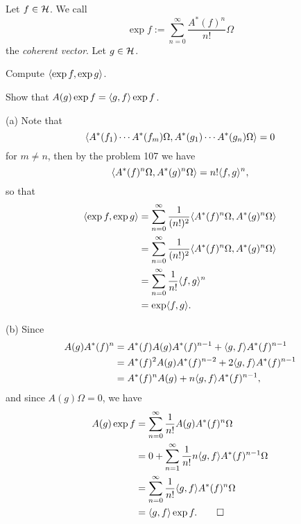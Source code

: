 \documentclass{../../../small}
\begin{document}
\begin{prb}
Let $f\in\mathcal{H}$.
We call
\[\exp f:=\sum_{n=0}^\infty\frac{A^*(f)^n}{n!}\Omega\]
the \emph{coherent vector}.
Let $g\in\mathcal{H}$.
\begin{parts}
\item Compute $\langle\exp f,\exp g\rangle$.
\item Show that $A(g)\exp f=\langle g,f\rangle\exp f$.
\end{parts}
\end{prb}
\begin{sol}
(a)
Note that
\[\langle A^*(f_1)\cdots A^*(f_m)\Omega,A^*(g_1)\cdots A^*(g_n)\Omega\rangle=0\]
for $m\ne n$, then by the problem 107 we have
\[\langle A^*(f)^n\Omega,A^*(g)^n\Omega\rangle=n!\langle f,g\rangle^n,\]
so that
\begin{align*}
\langle\exp f,\exp g\rangle
&=\sum_{n=0}^\infty\frac1{(n!)^2}\langle A^*(f)^n\Omega,A^*(g)^n\Omega\rangle\\
&=\sum_{n=0}^\infty\frac1{(n!)^2}\langle A^*(f)^n\Omega,A^*(g)^n\Omega\rangle\\
&=\sum_{n=0}^\infty\frac1{n!}\langle f,g\rangle^n\\
&=\exp\langle f,g\rangle.
\end{align*}

(b)
Since
\begin{align*}
A(g)A^*(f)^n
&=A^*(f)A(g)A^*(f)^{n-1}+\langle g,f\rangle A^*(f)^{n-1}\\
&=A^*(f)^2A(g)A^*(f)^{n-2}+2\langle g,f\rangle A^*(f)^{n-1}\\
&=A^*(f)^nA(g)+n\langle g,f\rangle A^*(f)^{n-1},
\end{align*}
and since $A(g)\Omega=0$, we have
\begin{align*}
A(g)\exp f
&=\sum_{n=0}^\infty\frac1{n!}A(g)A^*(f)^n\Omega\\
&=0+\sum_{n=1}^\infty\frac1{n!}n\langle g,f\rangle A^*(f)^{n-1}\Omega\\
&=\sum_{n=0}^\infty\frac1{n!}\langle g,f\rangle A^*(f)^n\Omega\\
&=\langle g,f\rangle\exp f.\qedhere
\end{align*}
\end{sol}
\end{document}
